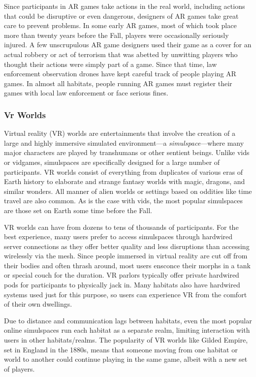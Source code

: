 Since participants in AR games take actions in the 
real world, including actions that could be disruptive 
or even dangerous, designers of AR games take great 
care to prevent problems. In some early AR games, 
most of which took place more than twenty years 
before the Fall, players were occasionally seriously 
injured. A few unscrupulous AR game designers used 
their game as a cover for an actual robbery or act 
of terrorism that was abetted by unwitting players 
who thought their actions were simply part of a game. 
Since that time, law enforcement observation drones 
have kept careful track of people playing AR games. 
In almost all habitats, people running AR games must 
register their games with local law enforcement or 
face serious fines.

\subsubsection{Vr Worlds}

Virtual reality (VR) worlds are entertainments that 
involve the creation of a large and highly immersive 
simulated environment—a \textit{simulspace}—where many 
major characters are played by transhumans or other 
sentient beings. Unlike vids or vidgames, simulspaces 
are specifically designed for a large number of participants. VR worlds consist of everything from duplicates of various eras of Earth history to elaborate and 
strange fantasy worlds with magic, dragons, and similar wonders. All manner of alien worlds or settings 
based on oddities like time travel are also common. As 
is the case with vids, the most popular simulspaces are 
those set on Earth some time before the Fall.

VR worlds can have from dozens to tens of thousands of participants. For the best experience, many 
users prefer to access simulspaces through hardwired 
server connections as they offer better quality and 
less disruptions than accessing wirelessly via the 
mesh. Since people immersed in virtual reality are cut 
off from their bodies and often thrash around, most 
users ensconce their morphs in a tank or special couch 
for the duration. VR parlors typically offer private 
hardwired pods for participants to physically jack in. 
Many habitats also have hardwired systems used just 
for this purpose, so users can experience VR from the 
comfort of their own dwellings.

Due to distance and communication lags between 
habitats, even the most popular online simulspaces 
run each habitat as a separate realm, limiting interaction with users in other habitats/realms. The popularity of VR worlds like Gilded Empire, set in England 
in the 1880s, means that someone moving from one 
habitat or world to another could continue playing in 
the same game, albeit with a new set of players.

